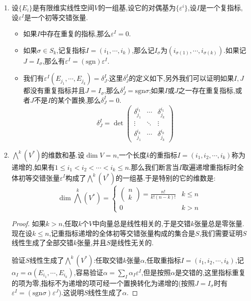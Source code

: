 \begin{enumerate}
	\item 设$\{E_i\}$是有限维实线性空间$V$的一组基,设它的对偶基为$\{\varepsilon^i\}$,设$I$是一个复指标,设$\varepsilon^I$是一个初等交错张量.
	\begin{itemize}
		\item 如果$I$中存在重复的指标,那么$\varepsilon^I=0$.
		\item 如果$\sigma\in S_k$,记复指标$I=(i_1,\cdots,i_k)$,那么记$I_{\sigma}$为$(i_{\sigma(1)},\cdots,i_{\sigma(k)})$.如果记$J=I_{\sigma}$,那么有$\varepsilon^I=(\mathrm{sgn})\varepsilon^I$.
		\item 我们有$\varepsilon^I(E_{j_1},\cdots,E_{j_k})=\delta_J^I$.这里$\delta_J^I$的定义如下,另外我们可以证明如果$I,J$都没有重复指标并且$J=I_{\sigma}$,那么$\delta_J^I=\mathrm{sgn}\sigma$;如果$I$或$J$之一存在重复指标,或者$J$不是$I$的某个置换,那么$\delta_J^I=0$.
		$$\delta_J^I=\det\left(\begin{array}{ccc}\delta_{j_1}^{i_1}&\cdots&\delta_{j_k}^{i_1}\\\vdots&\ddots&\vdots\\\delta_{j_1}^{i_k}&\cdots&\delta_{j_k}^{i_k}\end{array}\right)$$
	\end{itemize}
	\item $\bigwedge^k(V^*)$的维数和基.设$\dim V=n$,一个长度$k$的重指标$I=(i_1,i_2,\cdots,i_k)$称为递增的,如果有$1\le i_1<i_2<\cdots<i_k\le n$.那么我们断言当$I$取遍递增重指标时全体初等交错张量$\varepsilon^I$构成了$\bigwedge^k(V^*)$的一组基.于是特别的它的维数是:
	$$\dim\bigwedge^k(V^*)=\left\{\begin{array}{cc}\left(\begin{array}{c}n\\k\end{array}\right)=\frac{n!}{k!(n-k)!}&k\le n\\0&k>n\end{array}\right.$$
	\begin{proof}
		
		如果$k>n$,任取$k$个$V$中向量总是线性相关的,于是交错$k$张量总是零张量.现在设$k\le n$,记重指标递增的全体初等交错张量构成的集合是$S$,我们需要证明$S$线性生成了全部交错$k$张量,并且$S$是线性无关的.
		
		验证$S$线性生成了$\bigwedge^k(V^*)$:任取交错$k$张量$\alpha$,任取重指标$I=(i_1,i_2,\cdots,i_k)$,记$\alpha_I=\alpha(E_{i_1},\cdots,E_{i_k})$,容易验证$\alpha=\sum_I\alpha_I\varepsilon^I$,但是按照$\alpha$是交错的,这里指标重复的项为零,指标不为递增的项可经一个置换转化为递增的(按照$J=I_{\sigma}$时有$\varepsilon^I=(\mathrm{sgn}\sigma)\varepsilon^J$).这说明$S$线性生成了$\alpha$.
		

\end{proof}
\end{enumerate}
